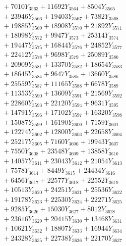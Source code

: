 \documentclass[a4paper,10pt]{article}
\begin{document}
{\begin{align}
&\;  + 7010 Y_{3563} + 11692 Y_{3564} + 8504 Y_{3565} \\[0.3ex]
&\;  + 23946 Y_{3566} + 19403 Y_{3567} + 7382 Y_{3568} \\[0.5ex]\allowbreak
&\;  + 19885 Y_{3569} + 18908 Y_{3570} + 21892 Y_{3571} \\[0.3ex]
&\;  + 18098 Y_{3572} + 9947 Y_{3573} + 25314 Y_{3574} \\[0.3ex]
&\;  + 19447 Y_{3575} + 16844 Y_{3576} + 24852 Y_{3577} \\[0.3ex]
&\;  + 22412 Y_{3578} + 9698 Y_{3579} + 25089 Y_{3580} \\[0.3ex]
&\;  + 20909 Y_{3581} + 13370 Y_{3582} + 18654 Y_{3583} \\[0.3ex]
&\;  + 18645 Y_{3584} + 9647 Y_{3585} + 13660 Y_{3586} \\[0.3ex]
&\;  + 25559 Y_{3587} + 11165 Y_{3588} + 6678 Y_{3589} \\[0.3ex]
&\;  + 11353 Y_{3590} + 13609 Y_{3591} + 21569 Y_{3592} \\[0.3ex]
&\;  + 22860 Y_{3593} + 22120 Y_{3594} + 9631 Y_{3595} \\[0.3ex]
&\;  + 14791 Y_{3596} + 17102 Y_{3597} + 16320 Y_{3598} \\[0.5ex]\allowbreak
&\;  + 15087 Y_{3599} + 16190 Y_{3600} + 7159 Y_{3601} \\[0.3ex]
&\;  + 12274 Y_{3602} + 12800 Y_{3603} + 22658 Y_{3604} \\[0.3ex]
&\;  + 25217 Y_{3605} + 7160 Y_{3606} + 19943 Y_{3607} \\[0.3ex]
&\;  + 7550 Y_{3608} + 23548 Y_{3609} + 13858 Y_{3610} \\[0.3ex]
&\;  + 14057 Y_{3611} + 23043 Y_{3612} + 21054 Y_{3613} \\[0.3ex]
&\;  + 7578 Y_{3614} + 8449 Y_{3615} + 24434 Y_{3616} \\[0.3ex]
&\;  + 6456 Y_{3617} + 22577 Y_{3618} + 22552 Y_{3619} \\[0.3ex]
&\;  + 10513 Y_{3620} + 24251 Y_{3621} + 25536 Y_{3622} \\[0.3ex]
&\;  + 19178 Y_{3623} + 22530 Y_{3624} + 22271 Y_{3625} \\[0.3ex]
&\;  + 9285 Y_{3626} + 15030 Y_{3627} + 8012 Y_{3628} \\[0.5ex]\allowbreak
&\;  + 23616 Y_{3629} + 20415 Y_{3630} + 13468 Y_{3631} \\[0.3ex]
&\;  + 10621 Y_{3632} + 18807 Y_{3633} + 16944 Y_{3634} \\[0.3ex]
&\;  + 24328 Y_{3635} + 22738 Y_{3636} + 22170 Y_{3637} \\[0.3ex]

\end{align}}
\end{document}
